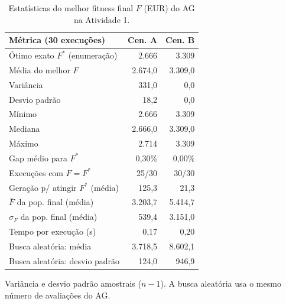 \begin{table}[!t]
\centering
\footnotesize
\setlength{\tabcolsep}{4pt}
\caption{Estatísticas do melhor fitness final $F$ (EUR) do AG na Atividade 1.}
\label{tab:a1_stats}
\begin{tabular}{@{}lrr@{}}
\toprule
Métrica (30 execuções) & Cen. A & Cen. B \\
\midrule
Ótimo exato $F^*$ (enumeração) & 2.666 & 3.309 \\
\midrule
Média do melhor $F$ & 2.674{,}0 & 3.309{,}0 \\
Variância & 331{,}0 & 0{,}0 \\
Desvio padrão & 18{,}2 & 0{,}0 \\
Mínimo & 2.666 & 3.309 \\
Mediana & 2.666{,}0 & 3.309{,}0 \\
Máximo & 2.714 & 3.309 \\
Gap médio para $F^*$ & 0{,}30\% & 0{,}00\% \\
Execuções com $F=F^*$ & 25/30 & 30/30 \\
Geração p/ atingir $F^*$ (média) & 125{,}3 & 21{,}3 \\
$\bar F$ da pop. final (média) & 3.203{,}7 & 5.414{,}7 \\
$\sigma_F$ da pop. final (média) & 539{,}4 & 3.151{,}0 \\
Tempo por execução (s) & 0{,}17 & 0{,}20 \\
\midrule
Busca aleatória: média & 3.718{,}5 & 8.602{,}1 \\
Busca aleatória: desvio padrão & 124{,}0 & 946{,}9 \\
\bottomrule
\end{tabular}
\par\smallskip\parbox{0.95\linewidth}{\scriptsize Variância e desvio padrão amostrais ($n-1$). A busca aleatória usa o mesmo número de avaliações do AG.}
\end{table}
